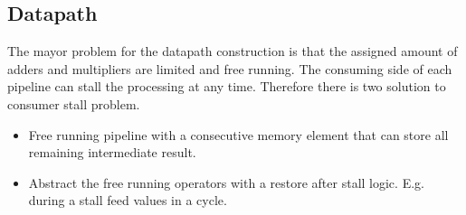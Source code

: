 \documentclass[a4paper]{scrartcl}
\begin{document}
\subsection{Datapath}
The mayor problem for the datapath construction is that the assigned amount of adders and multipliers are limited and free running. The consuming side of each pipeline can stall the processing at any time. Therefore there is two solution to consumer stall problem.
\begin{itemize}
	\item Free running pipeline with a consecutive memory element that can store all remaining intermediate result.
	
	\item Abstract the free running operators with a restore after stall logic. E.g. during a stall feed values in a cycle.  
\end{itemize}
\end{document}
